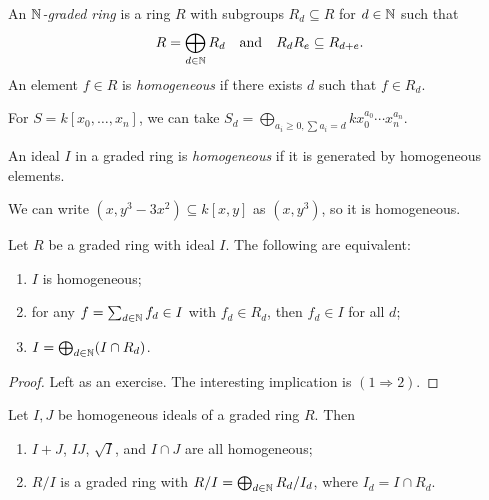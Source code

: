 \begin{definition}
  An \emph{$\mathbb{N}$-graded ring} is a ring
  $R$ with subgroups
  $R_d \subseteq R$ for $d \in \mathbb{N}$ such that
  \[
    R = \bigoplus_{d \in \mathbb{N}} R_d
    \quad\text{and}\quad
    R_d R_e \subseteq R_{d + e}.
  \]
  An element $f \in R$ is
  \emph{homogeneous} if there exists
  $d$ such that $f \in R_d$.
\end{definition}

\begin{example}
  For $S = k[x_0, \dots, x_n]$,
  we can take $S_d = \bigoplus_{a_i \ge 0, \sum a_i = d} k x_0^{a_0} \cdots x_n^{a_n}$.
\end{example}

\begin{definition}
  An ideal $I$ in a graded ring is \emph{homogeneous}
  if it is generated by homogeneous elements.
\end{definition}

\begin{example}
  We can write $(x, y^3 - 3x^2) \subseteq k[x, y]$
  as $(x, y^3)$, so it is homogeneous.
\end{example}

\begin{prop}
  Let $R$ be a graded ring with ideal
  $I$. The following are equivalent:
  \begin{enumerate}
    \item $I$ is homogeneous;
    \item for any $f = \sum_{d \in \mathbb{N}} f_d \in I$
      with $f_d \in R_d$, then
      $f_d \in I$ for all $d$;
    \item $I = \bigoplus_{d \in \mathbb{N}} (I \cap R_d)$.
  \end{enumerate}
\end{prop}

\begin{proof}
  Left as an exercise. The interesting
  implication is $(1 \Rightarrow 2)$.
\end{proof}

\begin{prop}
  Let $I, J$ be homogeneous ideals
  of a graded ring $R$. Then
  \begin{enumerate}
    \item $I + J$, $IJ$, $\sqrt{I}$, and
      $I \cap J$ are all homogeneous;
    \item $R / I$ is a graded ring
      with $R / I = \bigoplus_{d \in \mathbb{N}} R_d / I_d$, where
      $I_d = I \cap R_d$.
  \end{enumerate}
\end{prop}


